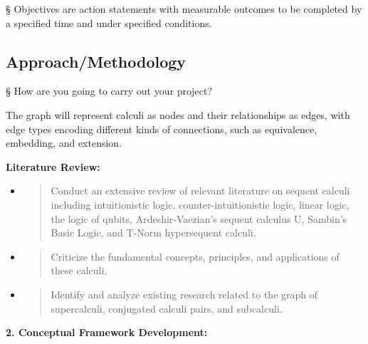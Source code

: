 § Objectives are action statements with measurable outcomes to be
completed by a specified time and under specified conditions.

\hypertarget{approachmethodology}{%
\subsection{\texorpdfstring{\textbf{Approach/Methodology}}{Approach/Methodology}}\label{approachmethodology}}

§ How are you going to carry out your project?

The graph will represent calculi as nodes and their relationships as
edges, with edge types encoding different kinds of connections, such as
equivalence, embedding, and extension.

\textbf{Literature Review:}

\begin{itemize}
\item
  \begin{quote}
  Conduct an extensive review of relevant literature on sequent calculi
  including intuitionistic logic, counter-intuitionistic logic, linear
  logic, the logic of qubits, Ardeshir-Vaezian's sequent calculus U,
  Sambin's Basic Logic, and T-Norm hypersequent calculi.
  \end{quote}
\item
  \begin{quote}
  Criticize the fundamental concepts, principles, and applications of
  these calculi.
  \end{quote}
\item
  \begin{quote}
  Identify and analyze existing research related to the graph of
  supercalculi, conjugated calculi pairs, and subcalculi.
  \end{quote}
\end{itemize}

\textbf{2. Conceptual Framework Development:}

